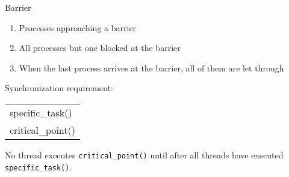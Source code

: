 \begin{frame}
\begin{center}
\end{center}
\end{frame}

\begin{frame}
\begin{center}
\end{center}
\end{frame}

\begin{frame}{Barrier}
  \begin{center}
  \end{center}
  \begin{enumerate}
  \item Processes approaching a barrier
  \item All processes but one blocked at the barrier
  \item When the last process arrives at the barrier, all of them are let through
  \end{enumerate}
  \begin{iblock}{Synchronization requirement:}
    \begin{center}\ttfamily
      \begin{tabular}{l}
        specific\_task()\\
        critical\_point()
      \end{tabular}
    \end{center}
    No thread executes \texttt{critical\_point()} until after all threads have executed
    \texttt{specific\_task()}.
  \end{iblock}
\end{frame}

